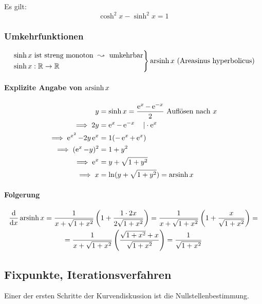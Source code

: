 
Es gilt:
\begin{equation*}
	\cosh^2 x - \sinh^2 x = 1
\end{equation*}

\subsubsection*{Umkehrfunktionen}

\begin{equation*}
	\left.
	\begin{aligned}
		&\sinh x \text{ ist streng monoton } \leadsto \text{ umkehrbar} \\
		&\sinh x : \mathbb{R} \rightarrow \mathbb{R}
	\end{aligned}
	\right\} \operatorname{arsinh} x \text{ (Areasinus hyperbolicus)}
\end{equation*}

\paragraph{Explizite Angabe von $\operatorname{arsinh} x$}
\begin{align*}
	y &= \sinh x = \frac{\operatorname{e}^x - \operatorname{e}^{-x}}{2} \text{ Auflösen nach $x$}\\
	\implies 2y &= \operatorname{e}^x - \operatorname{e}^{-x} \quad| \cdot \operatorname{e}^x \\
	\implies \operatorname{e}^{x^2} - 2y\operatorname{e}^x &= 1(-\operatorname{e}^x + \operatorname{e}^x) \\
	\implies (\operatorname{e}^x - y)^2 &= 1 + y^2 \\
	\implies \operatorname{e}^x &= y + \sqrt{1 + y^2} \\
	\implies x &= \ln (y + \sqrt{1 + y^2}) = \operatorname{arsinh} x
\end{align*}

\paragraph{Folgerung}
\begin{multline*}
	\frac{\mathrm d}{\mathrm d x} \operatorname{arsinh} x = \frac{1}{x + \sqrt{1 + x^2}}\left(1 + \frac{1 \cdot 2x}{2\sqrt{1 + x^2}}\right) = \frac{1}{x + \sqrt{1 + x^2}} \left(1 + \frac{x}{\sqrt{1 + x^2}} \right) = \\
	= \frac{1}{x + \sqrt{1 + x^2}} \left(\frac{\sqrt{1 + x^2} + x}{\sqrt{1 + x^2}}\right) = \frac{1}{\sqrt{1 + x^2}}
\end{multline*}

\subsection{Fixpunkte, Iterationsverfahren}
Einer der ersten Schritte der Kurvendiskussion ist die Nullstellenbestimmung.

